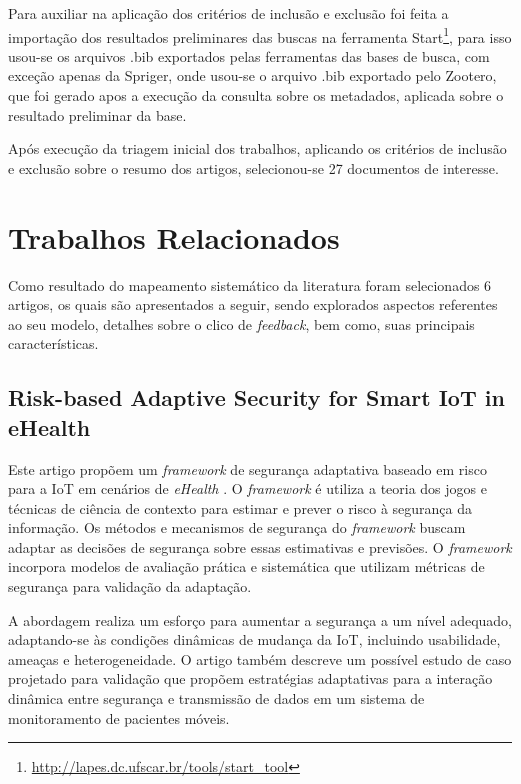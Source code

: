 \documentclass[tid,table]{texufpel} %
\begin{document}
Para auxiliar na aplicação dos critérios de inclusão e exclusão foi feita a importação dos resultados preliminares das buscas na ferramenta Start\footnote{\url{http://lapes.dc.ufscar.br/tools/start_tool}},
para isso usou-se os arquivos .bib exportados pelas ferramentas das bases de busca, com exceção apenas da Spriger, onde usou-se o arquivo .bib exportado pelo Zootero, que foi gerado apos a execução da consulta sobre os metadados, aplicada sobre o resultado preliminar da base.

Após execução da triagem inicial dos trabalhos, aplicando os critérios de inclusão e exclusão sobre o resumo dos artigos, selecionou-se 27 documentos de interesse. 

\section{Trabalhos Relacionados}

Como resultado do mapeamento sistemático da literatura foram selecionados 6 artigos, os quais são apresentados a seguir, sendo explorados aspectos referentes ao seu modelo, detalhes sobre o clico de \textit{feedback}, bem como, suas principais características. 


\subsection{Risk-based Adaptive Security for Smart IoT in eHealth} %

Este artigo propõem um \textit{framework} de segurança adaptativa baseado em risco para a IoT em cenários de \textit{eHealth} \cite{habtamu12}. O \textit{framework} é utiliza a teoria dos jogos e técnicas de ciência de contexto para estimar e prever o risco à segurança da informação. Os métodos e mecanismos de segurança do \textit{framework} buscam adaptar as decisões de segurança sobre essas estimativas e previsões. O \textit{framework} incorpora modelos de avaliação prática e sistemática que utilizam métricas de segurança para validação da adaptação.

A abordagem realiza um esforço para aumentar a segurança a um nível adequado, adaptando-se às condições dinâmicas de mudança da IoT, incluindo usabilidade, ameaças e heterogeneidade. O artigo também descreve um possível estudo de caso projetado para validação que propõem estratégias adaptativas para a interação dinâmica entre segurança e transmissão de dados em um sistema de monitoramento de pacientes móveis.
\end{document}
